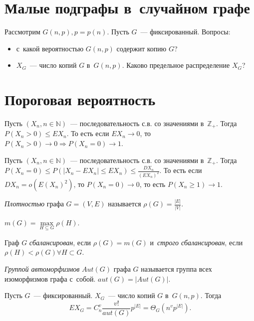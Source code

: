 \documentclass{article}
\begin{document}
\section{Малые подграфы в~случайном графе}

Рассмотрим $G(n, p), p = p(n)$. Пусть $G$~--- фиксированный. Вопросы:
\begin{itemize}
	\item с~какой вероятностью $G(n, p)$ содержит копию $G$?
	\item $X_G$~--- число копий $G$ в~$G(n, p)$. Каково предельное распределение
		$X_G$?
\end{itemize}

\section{Пороговая вероятность}

\begin{claim}
	Пусть $(X_n, n \in \mathbb{N})$~--- последовательность с.в. со значениями
	в~$\mathbb{Z}_+$. Тогда $P(X_n > 0) \le EX_n$. То есть если $EX_n \rightarrow
	0$, то $P(X_n > 0) \rightarrow 0 \Rightarrow P(X_n = 0) \rightarrow 1$.
\end{claim}

\begin{claim}
	Пусть $(X_n, n \in \mathbb{N})$~--- последовательность с.в. со значениями
	в~$\mathbb{Z}_+$. Тогда $P(X_n = 0) \le P(|X_n - EX_n| \le EX_n) \le
	\frac{DX_n}{(EX_n)^2}$. То есть если $DX_n = o(E(X_n)^2)$, то $P(X_n = 0)
	\rightarrow 0$, то есть $P(X_n \ge 1) \rightarrow 1$.
\end{claim}

\begin{definition}
	\emph{Плотностью} графа $G = (V, E)$ называется $\rho(G) = \frac{|E|}{|V|}$.

	$m(G) = \max\limits_{H \subseteq G} \rho(H)$.

	Граф $G$ \emph{сбалансирован}, если $\rho(G) = m(G)$ и~\emph{строго
	сбалансирован}, если $\rho(H) < \rho(G) \forall H \subset G$.
\end{definition}

\begin{definition}
	\emph{Группой автоморфизмов} $Aut(G)$ графа $G$ называется группа всех
	изоморфизмов графа с~собой. $aut(G) = |Aut(G)|$.
\end{definition}

\begin{lemma}
	Пусть $G$~--- фиксированный. $X_G$~--- число копий $G$ в~$G(n, p)$. Тогда
	$$EX_G = C_n^v \frac{v!}{aut(G)} p^{|E|} = \Theta_G(n^v p^{|E|}).$$
\end{lemma}
\end{document}
